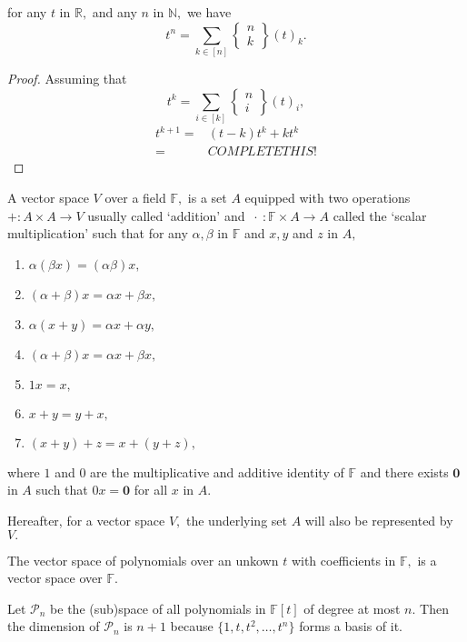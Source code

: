\begin{theorem}
for any $t$ in $\mathbb{R},$ and any $n$ in $\mathbb{N},$ we have
$$	 t^n = \sum_{k \in [n]} 
\begin{Bmatrix} n\\k \end{Bmatrix} (t)_k. $$
\end{theorem}

\begin{proof}
	Assuming that $$t^{k} = \sum_{i \in [k]} 
	\begin{Bmatrix} n \\ i \end{Bmatrix} (t)_i,$$
\begin{align*}
	t^{k+1} ={}& (t-k) t^k + k t^k \\
	={}& COMPLETE THIS!
\end{align*}
\end{proof}

\begin{definition}
	A vector space $V$ over a field $\mathbb{F},$ is a set
	$A$ equipped with two operations $+ \colon A \times A \to V$ usually called `addition' and
	$\ \cdot \  \colon \mathbb{F} \times A \to A$ called the `scalar multiplication' such that for any $\alpha, \beta$ in
	$\mathbb{F}$ and $x,y$ and $z$ in $A,$
	\begin{enumerate}
		\item $\alpha(\beta x) = (\alpha \beta)x,$
		\item $(\alpha + \beta) x = \alpha x + \beta x,$
		\item $\alpha(x + y) = \alpha x + \alpha y,$
		\item $(\alpha + \beta) x = \alpha x + \beta x,$
		\item $ 1 x = x,$
		\item $x+y = y+x,$
		\item $(x+y)+z = x + (y+z),$
	\end{enumerate}
	where $1$ and $0$ are the multiplicative and additive identity of $\mathbb{F}$ and there exists $\mathbf{0}$ in $A$ such that $0 x = \mathbf{0}$
	for all $x$ in $A.$
\end{definition}

Hereafter, for a vector space $V,$ the underlying set $A$ will also be 
represented by $V.$

The vector space of polynomials over an unkown $t$ with coefficients
in $\mathbb{F},$ is a vector space over $\mathbb{F}.$

Let $\mathcal{P}_n$ be the (sub)space of all polynomials in
$\mathbb{F}[t]$ of degree at most $n.$ Then  
the dimension of $\mathcal{P}_n$ is $n+1$ because $\{ 1, t, t^2,
\dotsc, t^n \}$ forms a basis of it.

